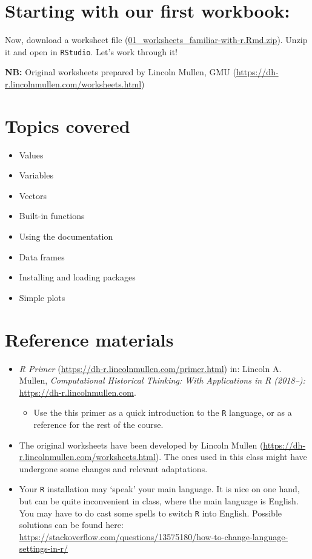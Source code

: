 \documentclass[
]{book}
\providecommand{\tightlist}{%
  \setlength{\itemsep}{0pt}\setlength{\parskip}{0pt}}
\begin{document}
\hypertarget{starting-with-our-first-workbook}{%
\section{Starting with our first workbook:}\label{starting-with-our-first-workbook}}

Now, download a worksheet file (\href{./files/ws/01_worksheets_familiar-with-r.Rmd.zip}{01\_worksheets\_familiar-with-r.Rmd.zip}). Unzip it and open in \texttt{RStudio}. Let's work through it!

\textbf{NB:} Original worksheets prepared by Lincoln Mullen, GMU (\url{https://dh-r.lincolnmullen.com/worksheets.html})

\hypertarget{L01_topics}{%
\section{Topics covered}\label{L01_topics}}

\begin{itemize}
\tightlist
\item
  Values
\item
  Variables
\item
  Vectors
\item
  Built-in functions
\item
  Using the documentation
\item
  Data frames
\item
  Installing and loading packages
\item
  Simple plots
\end{itemize}

\hypertarget{L01_RM}{%
\section{Reference materials}\label{L01_RM}}

\begin{itemize}
\tightlist
\item
  \emph{R Primer} (\url{https://dh-r.lincolnmullen.com/primer.html}) in: Lincoln A. Mullen, \emph{Computational Historical Thinking: With Applications in R (2018--):} \url{https://dh-r.lincolnmullen.com}.

  \begin{itemize}
  \tightlist
  \item
    Use the this primer as a quick introduction to the \texttt{R} language, or as a reference for the rest of the course.
  \end{itemize}
\item
  The original worksheets have been developed by Lincoln Mullen (\url{https://dh-r.lincolnmullen.com/worksheets.html}). The ones used in this class might have undergone some changes and relevant adaptations.
\item
  Your \texttt{R} installation may `speak' your main language. It is nice on one hand, but can be quite inconvenient in class, where the main language is English. You may have to do cast some spells to switch \texttt{R} into English. Possible solutions can be found here: \url{https://stackoverflow.com/questions/13575180/how-to-change-language-settings-in-r/}
\end{itemize}
\end{document}
